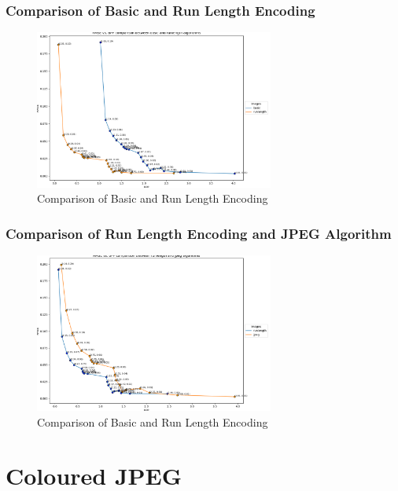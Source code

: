 \documentclass[Serif, 10pt, brown]{beamer}
\theoremstyle{example}
\theoremstyle{plain}
\begin{document}
\begin{frame}
	\frametitle{Comparison of Basic and Run Length Encoding}

	\begin{figure}
		\centering
		\includegraphics[width=0.7\textwidth]{../results/basic_runlength_comparison.png}
		\caption{Comparison of Basic and Run Length Encoding}
	\end{figure}
\end{frame}

\begin{frame}
	\frametitle{Comparison of Run Length Encoding and JPEG Algorithm}

	\begin{figure}
		\centering
		\includegraphics[width=0.7\textwidth]{../results/runlength_jpeg_comparison.png}
		\caption{Comparison of Basic and Run Length Encoding}
	\end{figure}
\end{frame}

\section{Coloured JPEG}
\end{document}
